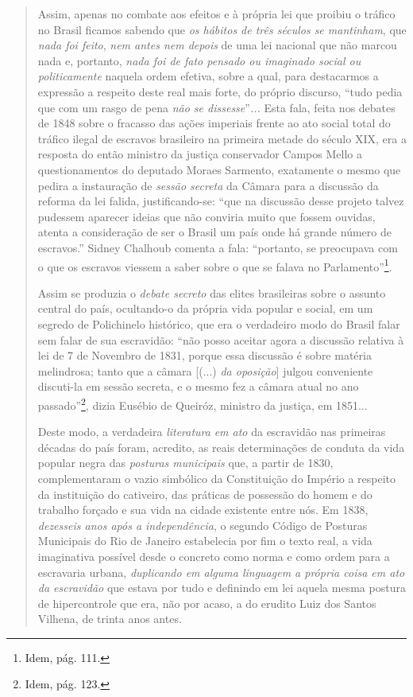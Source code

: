 \begin{quote}
Assim, apenas no combate aos efeitos e à própria lei que proibiu o
tráfico no Brasil ficamos sabendo que \emph{os hábitos de três séculos
se mantinham}, que \emph{nada foi feito}, \emph{nem antes nem depois} de
uma lei nacional que não marcou nada e, portanto, \emph{nada foi de fato
pensado ou imaginado social ou politicamente} naquela ordem efetiva,
sobre a qual, para destacarmos a expressão a respeito deste real mais
forte, do próprio discurso, ``tudo pedia que com um rasgo de pena
\emph{não se dissesse}''\emph{...} Esta fala, feita nos debates de 1848
sobre o fracasso das ações imperiais frente ao ato social total do
tráfico ilegal de escravos brasileiro na primeira metade do século XIX,
era a resposta do então ministro da justiça conservador Campos Mello a
questionamentos do deputado Moraes Sarmento, exatamente o mesmo que
pedira a instauração de \emph{sessão secreta} da Câmara para a discussão
da reforma da lei falida, justificando-se: ``que na discussão desse
projeto talvez pudessem aparecer ideias que não conviria muito que
fossem ouvidas, atenta a consideração de ser o Brasil um país onde há
grande número de escravos.'' Sidney Chalhoub comenta a fala: ``portanto,
se preocupava com o que os escravos viessem a saber sobre o que se
falava no Parlamento''\footnote{Idem, pág. 111.}.

Assim se produzia o \emph{debate secreto} das elites brasileiras sobre o
assunto central do país, ocultando-o da própria vida popular e social,
em um segredo de Polichinelo histórico, que era o verdadeiro modo do
Brasil falar sem falar de sua escravidão: ``não posso aceitar agora a
discussão relativa à lei de 7 de Novembro de 1831, porque essa discussão
é sobre matéria melindrosa; tanto que a câmara {[}(...) \emph{da
oposição}{]} julgou conveniente discuti-la em sessão secreta, e o mesmo
fez a câmara atual no ano passado''\footnote{Idem, pág. 123.}, dizia
Eusébio de Queiróz, ministro da justiça, em 1851...

Deste modo, a verdadeira \emph{literatura} \emph{em ato} da escravidão
nas primeiras décadas do país foram, acredito, as reais determinações de
conduta da vida popular negra das \emph{posturas municipais} que, a
partir de 1830, complementaram o vazio simbólico da Constituição do
Império a respeito da instituição do cativeiro, das práticas de
possessão do homem e do trabalho forçado e sua vida na cidade existente
entre nós. Em 1838, \emph{dezesseis anos após a independência}, o
segundo Código de Posturas Municipais do Rio de Janeiro estabelecia por
fim o texto real, a vida imaginativa possível desde o concreto como
norma e como ordem para a escravaria urbana, \emph{duplicando em alguma
linguagem a própria coisa em ato da escravidão} que estava por tudo e
definindo em lei aquela mesma postura de hipercontrole que era, não por
acaso, a do erudito Luiz dos Santos Vilhena, de trinta anos antes.


\end{quote}
